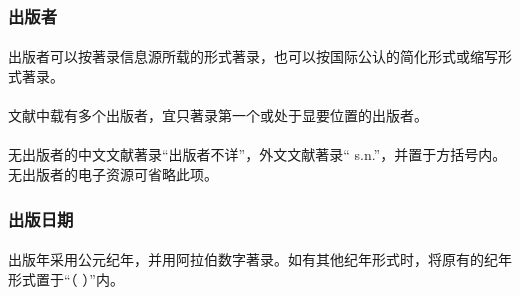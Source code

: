 \documentclass{article}
\begin{document}
\subsubsection{出版者}

\paragraph{} 出版者可以按著录信息源所载的形式著录，也可以按国际公认的简化形式或缩写形式著录。

\begin{refsection}
\nocite{egbookpubpublishera--}
\nocite{egbookpubpublisherb--}
\nocite{egbookpubpublisherc--}

{}
\end{refsection}

\paragraph{} 文献中载有多个出版者，宜只著录第一个或处于显要位置的出版者。


\begin{refsection}
\nocite{egbookpubpublisherd--}

{}
\end{refsection}

\paragraph{} 无出版者的中文文献著录“出版者不详”，外文文献著录“ s.n.”，并置于方括号内。无出版者的电子资源可省略此项。

\begin{refsection}

\nocite{egbookpubpublishere--}
\nocite{egbookpubpublisherf--}

{}
\end{refsection}



\subsubsection{出版日期}

\paragraph{} 出版年采用公元纪年，并用阿拉伯数字著录。如有其他纪年形式时，将原有的纪年形式置于“（ ）”内。
\end{document}
